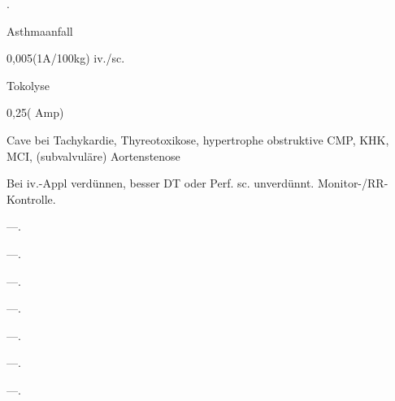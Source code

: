 
{
\begin{MedikamentCharakteristika}
  \item[{\TxItemSpezialitaeten}]  
  .
  \item[{\TxItemIndikation}] 
  \item[{\TxItemKontraindikation}] Asthmaanfall

  \item[{\TxItemDosierung}] 0,005\MgKg* (1A/100kg) iv./sc.
  \item[{\TxItemIndikation}] Tokolyse
  \item[{\TxItemDosierung}] 0,25\Mg* ({\textonehalf} Amp)

  \item[{\TxItemKontraindikation}]  
  Cave bei Tachykardie, 
  Thyreotoxikose, 
  hypertrophe obstruktive CMP, 
  KHK, 
  MCI, 
  (subvalvuläre) Aortenstenose
  \item[{\TxItemAnmerkung}] 
  Bei iv.-Appl verdünnen, besser DT oder Perf. sc. 
  unverdünnt. Monitor-/RR-Kontrolle.
\end{MedikamentCharakteristika}
}
{}







{
\begin{MedikamentCharakteristika}
  \item[{\TxItemSpezialitaeten}] ---.
  \item[Beschreibung] ---.
  \item[{\TxItemIndikation}] ---.
  \item[{\TxItemKontraindikation}] ---.
  \item[{\TxItemDosierung}] ---.
  \item[{\TxItemCave}] ---.
  \item[Anm] ---.
\end{MedikamentCharakteristika}}
{}



\section{}

